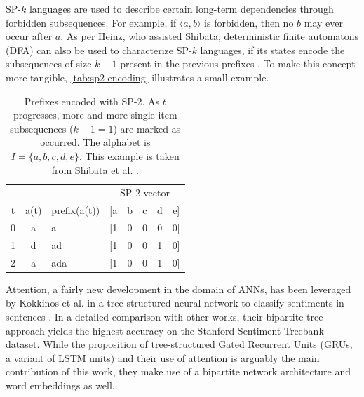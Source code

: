 SP-$k$ languages are used to describe certain long-term dependencies through forbidden subsequences. For example, if $\langle a,b \rangle$ is forbidden, then no $b$ may ever occur after $a$. As per Heinz, who assisted Shibata, deterministic finite automatons (DFA) can also be used to characterize SP-$k$ languages, if its states encode the subsequences of size $k-1$  present in the previous prefixes \cite{heinz2010estimatingSP}. To make this concept more tangible, \autoref{tab:sp2-encoding} illustrates a small example.

\begin{table}[ht!]
    \centering
    \begin{tabular}{cclccccc}
        \hline
          &      &              & \multicolumn{5}{c}{SP-2 vector}\\
        t & a(t) & prefix(a(t)) & [a & b & c & d & e]\\
        \hline
        0 & a    & a            & [1 & 0 & 0 & 0 & 0]\\
        1 & d    & ad           & [1 & 0 & 0 & 1 & 0]\\
        2 & a    & ada          & [1 & 0 & 0 & 1 & 0]\\
        \hline
    \end{tabular}
    \caption{Prefixes encoded with SP-2. As $t$ progresses, more and more single-item subsequences ($k-1=1$) are marked as occurred. The alphabet is $I=\{a,b,c,d,e\}$. This example is taken from Shibata et al.  \cite{shibata2016bipartite}.}
    \label{tab:sp2-encoding}
\end{table}

Attention, a fairly new development in the domain of ANNs, has been leveraged by Kokkinos et al. in a tree-structured neural network to classify sentiments in sentences \cite{kokkinos2017structural}. In a detailed comparison with other works, their bipartite tree approach yields the highest accuracy on the Stanford Sentiment Treebank dataset. While the proposition of tree-structured Gated Recurrent Units (GRUs, a variant of LSTM units) and their use of attention is arguably the main contribution of this work, they make use of a bipartite network architecture and word embeddings as well.